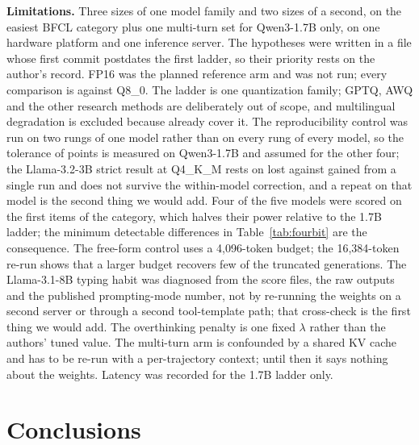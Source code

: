 \documentclass[12pt,letterpaper]{article}
\newcommand{\bfcl}{BFCL}
\newcommand{\qm}{Qwen3-1.7B}
\begin{document}
\textbf{Limitations.} Three sizes of one model family and two sizes of a second, on the easiest \bfcl{} category plus one multi-turn set for \qm{} only, on one hardware platform and one inference server. The hypotheses were written in a file whose first commit postdates the first ladder, so their priority rests on the author's record. FP16 was the planned reference arm and was not run; every comparison is against Q8\_0. The ladder is one quantization family; GPTQ, AWQ and the other research methods are deliberately out of scope, and multilingual degradation is excluded because \citet{marchisio2024multilingual} already cover it. The reproducibility control was run on two rungs of one model rather than on every rung of every model, so the tolerance of \qtMaxRepRange{} points is measured on \qm{} and assumed for the other four; the Llama-3.2-3B strict result at Q4\_K\_M rests on \qtLostLlamaThreeBFour{} lost against \qtGainedLlamaThreeBFour{} gained from a single run and does not survive the within-model correction, and a repeat on that model is the second thing we would add. Four of the five models were scored on the first \qtNEightB{} items of the category, which halves their power relative to the 1.7B ladder; the minimum detectable differences in Table~\ref{tab:fourbit} are the consequence. The free-form control uses a 4{,}096-token budget; the 16{,}384-token re-run shows that a larger budget recovers few of the \qtGsmTruncThree{} truncated generations. The Llama-3.1-8B typing habit was diagnosed from the score files, the raw outputs and the published prompting-mode number, not by re-running the weights on a second server or through a second tool-template path; that cross-check is the first thing we would add. The overthinking penalty is one fixed $\lambda$ rather than the authors' tuned value. The multi-turn arm is confounded by a shared KV cache and has to be re-run with a per-trajectory context; until then it says nothing about the weights. Latency was recorded for the 1.7B ladder only.

\section{Conclusions}
\end{document}
